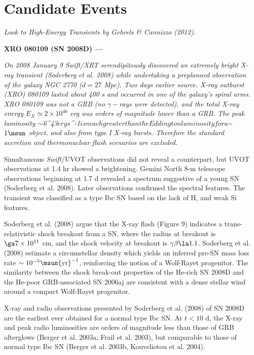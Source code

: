 \section{Candidate Events}\label{section:candidates}


{\em Look to High-Energy Transients by Gehrels \& Cannizzo (2012).  }


{\bf XRO 080109 (SN 2008D) ---} {\it On 2008 January 9 \emph{Swift}/XRT
serendipitously discovered an extremely bright X-ray transient
(Soderberg et al. 2008) while undertaking a preplanned observation
of the galaxy NGC 2770 ($d=27$ Mpc).  Two days earlier
source.  X-ray outburst (XRO) 080109 lasted about 400 s and occurred
in one of the galaxy's spiral arms.  XRO 080109 was not a GRB (no
$\gamma-$rays were detected), and the total X-ray energy $E_X \simeq
2\times 10^{46}$ erg was orders of magnitude lower than a GRB.  The
peak luminosity $\sim$6^{43}$ erg s$^{-1}$ is much greater
than the Eddington luminosity for a $\sim$1\msun$ object, and also
from type I X-ray bursts. Therefore the standard accretion and
thermonuclear flash scenarios are excluded.


Simultaneous \emph{Swift}/UVOT 
observations did not reveal a counterpart,
but UVOT observations at 1.4 hr showed a brightening.
Gemini North 8-m telescope 
observations beginning at 1.7 d 
revealed a spectrum   suggestive
of a young SN (Soderberg et al. 2008).
Later observations
confirmed the spectral features.
The transient was classified as
a type Ibc SN based on the lack of H, and weak Si features.



Soderberg et al. (2008) argue that the X-ray flash (Figure 9)
indicates a trans-relativistic shock breakout from a SN, where the
radius at breakout is $\ga7\times 10^{11}$ cm, and the shock velocity
at breakout is $\gamma\beta\la1.1$.  Soderberg et al. (2008) estimate
a circumstellar density which yields an inferred pre-SN mass loss
rate $\sim10^{-5}\msun {\rm yr}^{-1}$, reinforcing the notion of a Wolf-Rayet
progenitor.  The similarity between the shock break-out properties of
the He-rich SN 2008D and the He-poor GRB-associated SN 2006aj are
consistent with a dense stellar wind around a compact Wolf-Rayet
progenitor.


X-ray and radio observations presented by Soderberg et al. (2008) of
SN 2008D are the earliest ever obtained for a normal type Ibc SN.  At
$t < 10$ d, the X-ray and peak radio luminosities are orders of
magnitude less than those of GRB afterglows (Berger et al. 2003a,
Frail et al. 2003), but comparable to those of normal type Ibc SN
(Berger et al. 2003b, Kouveliotou et al. 2004).
}\\


